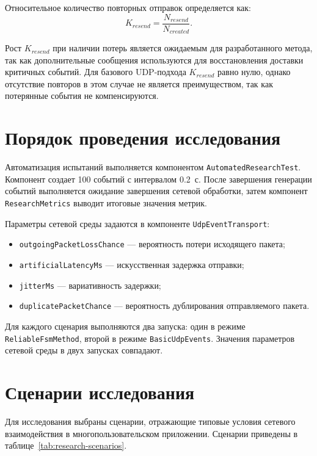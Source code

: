 Относительное количество повторных отправок определяется как:
\[
	K_{resend} = \frac{N_{resend}}{N_{created}}.
\]

Рост $K_{resend}$ при наличии потерь является ожидаемым для разработанного метода, так как дополнительные сообщения используются для восстановления доставки критичных событий. 
Для базового UDP-подхода $K_{resend}$ равно нулю, однако отсутствие повторов в этом случае не является преимуществом, так как потерянные события не компенсируются.

\section{Порядок проведения исследования}

Автоматизация испытаний выполняется компонентом \texttt{AutomatedResearchTest}. Компонент создает 100 событий с интервалом 0.2~с. После завершения генерации событий выполняется ожидание завершения сетевой обработки, затем компонент \texttt{ResearchMetrics} выводит итоговые значения метрик.

Параметры сетевой среды задаются в компоненте \texttt{UdpEventTransport}:
\begin{itemize}
	\item \texttt{outgoingPacketLossChance} --- вероятность потери исходящего пакета;
	\item \texttt{artificialLatencyMs} --- искусственная задержка отправки;
	\item \texttt{jitterMs} --- вариативность задержки;
	\item \texttt{duplicatePacketChance} --- вероятность дублирования отправляемого пакета.
\end{itemize}

Для каждого сценария выполняются два запуска: один в режиме \texttt{ReliableFsmMethod}, второй в режиме \texttt{BasicUdpEvents}. Значения параметров сетевой среды в двух запусках совпадают.

\section{Сценарии исследования}

Для исследования выбраны сценарии, отражающие типовые условия сетевого взаимодействия в многопользовательском приложении. Сценарии приведены в таблице~\ref{tab:research-scenarios}.

